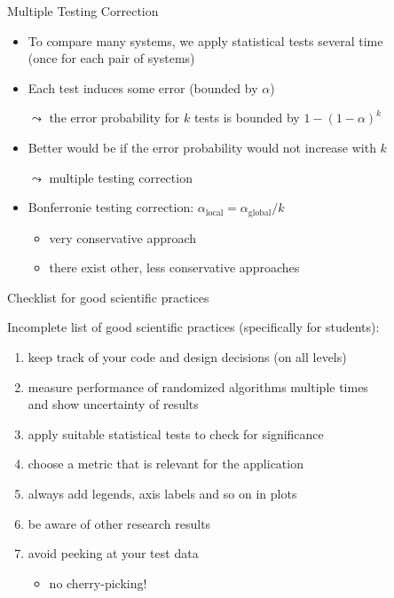 \begin{frame}[c]{Multiple Testing Correction}

\begin{itemize}
	\item To compare many systems, we apply statistical tests several time\\
	(once for each pair of systems)
	\item Each test induces some error (bounded by $\alpha$)
	\item[$\leadsto$] the error probability for $k$ tests is bounded by $1 - (1 - \alpha)^k$
	\pause
	\smallskip
	\item Better would be if the error probability would not increase with $k$
	\item[$\leadsto$] multiple testing correction
	\pause
	\smallskip
	\item Bonferronie testing correction: $\alpha_{\text{local}} = \alpha_{\text{global}} / k$
	\pause
	\begin{itemize}
		\item very conservative approach
		\item there exist other, less conservative approaches
	\end{itemize}
	
\end{itemize}

\end{frame}
\begin{frame}[c]{Checklist for good scientific practices}

Incomplete list of good scientific practices (specifically for students):
\begin{enumerate}
	\item keep track of your code and design decisions (on all levels)
	\item measure performance of randomized algorithms multiple times\\
		  and show uncertainty of results
	\item apply suitable statistical tests to check for significance
	\item choose a metric that is relevant for the application
	\item always add legends, axis labels and so on in plots
	\item be aware of other research results
	\item avoid peeking at your test data
	\begin{itemize}
		\item no cherry-picking!
	\end{itemize}
\end{enumerate}

\end{frame}
